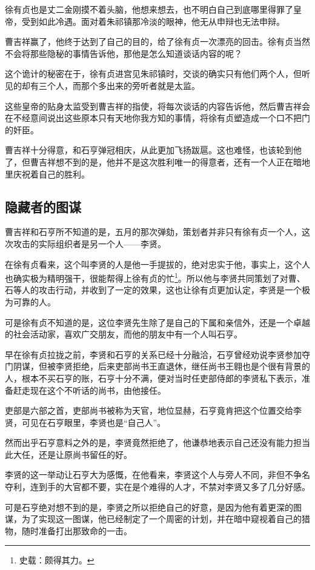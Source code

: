 \begin{multicols}{\theparacolNo}
徐有贞也是丈二金刚摸不着头脑，他想来想去，也不明白自己到底哪里得罪了皇帝，受到如此冷遇。面对着朱祁镇那冷淡的眼神，他无从申辩也无法申辩。

曹吉祥赢了，他终于达到了自己的目的，给了徐有贞一次漂亮的回击。徐有贞当然不会将那些隐秘的事情告诉他，那他是怎么知道谈话内容的呢？

这个诡计的秘密在于，徐有贞进宫见朱祁镇时，交谈的确实只有他们两个人，但听见的却有三个人，而那个多出来的旁听者就是太监。

这些皇帝的贴身太监受到曹吉祥的指使，将每次谈话的内容告诉他，然后曹吉祥会在不经意间说出这些原本只有天地你我方知的事情，将徐有贞塑造成一个口不把门的奸臣。

曹吉祥十分得意，和石亨弹冠相庆，从此更加飞扬跋扈。这也难怪，也该轮到他了，但曹吉祥想不到的是，他并不是这次胜利唯一的得意者，还有一个人正在暗地里庆祝着自己的胜利。

\subsection{隐藏者的图谋}
曹吉祥和石亨所不知道的是，五月的那次弹劾，策划者并非只有徐有贞一个人，这次攻击的实际组织者是另一个人——李贤。

在徐有贞看来，这个叫李贤的人是他一手提拔的，绝对忠实于他，事实上，这个人也确实极为精明强干，很能帮得上徐有贞的忙\footnote{史载：颇得其力。}。所以他与李贤共同策划了对曹、石等人的攻击行动，并收到了一定的效果，这也让徐有贞更加认定，李贤是一个极为可靠的人。

可是徐有贞不知道的是，这位李贤先生除了是自己的下属和亲信外，还是一个卓越的社会活动家，喜欢广交朋友，而他的朋友中有一个人叫石亨。

早在徐有贞拉拢之前，李贤和石亨的关系已经十分融洽，石亨曾经劝说李贤参加夺门阴谋，但被李贤拒绝，后来吏部尚书王直退休，继任尚书王翱也是个很有背景的人，根本不买石亨的账，石亨十分不满，便对当时任吏部侍郎的李贤私下表示，准备赶走现在这个不听话的尚书，由他接任。

吏部是六部之首，吏部尚书被称为天官，地位显赫，石亨竟肯把这个位置交给李贤，可见在石亨眼里，李贤也是“自己人”。

然而出乎石亨意料之外的是，李贤竟然拒绝了，他谦恭地表示自己还没有能力担当此大任，还是让原尚书留任的好。

李贤的这一举动让石亨大为感慨，在他看来，李贤这个人与旁人不同，非但不争名夺利，连到手的大官都不要，实在是个难得的人才，不禁对李贤又多了几分好感。

可是石亨绝对想不到的是，李贤之所以拒绝自己的好意，是因为他有着更深的图谋，为了实现这一图谋，他已经制定了一个周密的计划，并在暗中窥视着自己的猎物，随时准备打出那致命的一击。


\end{multicols}
